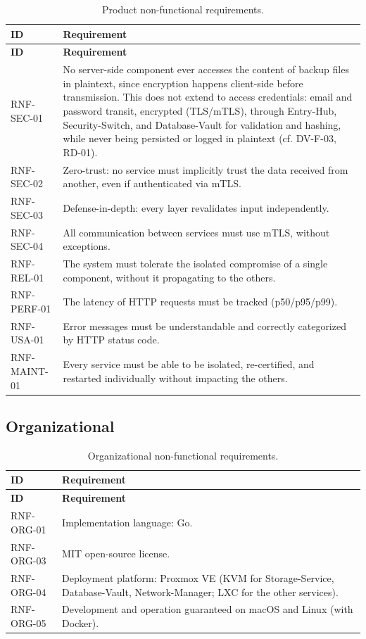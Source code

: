 \begin{longtable}{p{2.6cm} p{\dimexpr\linewidth-2.6cm-4\tabcolsep\relax}}
\caption{Product non-functional requirements.} \\
\hline
\textbf{ID} & \textbf{Requirement} \\
\hline
\endfirsthead
\hline
\textbf{ID} & \textbf{Requirement} \\
\hline
\endhead
\hline
\endfoot
\hline
\endlastfoot
RNF-SEC-01 & No server-side component ever accesses the content of backup files in plaintext, since encryption happens client-side before transmission. This does not extend to access credentials: email and password transit, encrypted (TLS/mTLS), through Entry-Hub, Security-Switch, and Database-Vault for validation and hashing, while never being persisted or logged in plaintext (cf. DV-F-03, RD-01). \\
RNF-SEC-02 & Zero-trust: no service must implicitly trust the data received from another, even if authenticated via mTLS. \\
RNF-SEC-03 & Defense-in-depth: every layer revalidates input independently. \\
RNF-SEC-04 & All communication between services must use mTLS, without exceptions. \\
RNF-REL-01 & The system must tolerate the isolated compromise of a single component, without it propagating to the others. \\
RNF-PERF-01 & The latency of HTTP requests must be tracked (p50/p95/p99). \\
RNF-USA-01 & Error messages must be understandable and correctly categorized by HTTP status code. \\
RNF-MAINT-01 & Every service must be able to be isolated, re-certified, and restarted individually without impacting the others. \\
\end{longtable}

\subsection{Organizational}

\begin{longtable}{p{2.6cm} p{\dimexpr\linewidth-2.6cm-4\tabcolsep\relax}}
\caption{Organizational non-functional requirements.} \\
\hline
\textbf{ID} & \textbf{Requirement} \\
\hline
\endfirsthead
\hline
\textbf{ID} & \textbf{Requirement} \\
\hline
\endhead
\hline
\endfoot
\hline
\endlastfoot
RNF-ORG-01 & Implementation language: Go. \\
RNF-ORG-03 & MIT open-source license. \\
RNF-ORG-04 & Deployment platform: Proxmox VE (KVM for Storage-Service, Database-Vault, Network-Manager; LXC for the other services). \\
RNF-ORG-05 & Development and operation guaranteed on macOS and Linux (with Docker). \\
\end{longtable}

